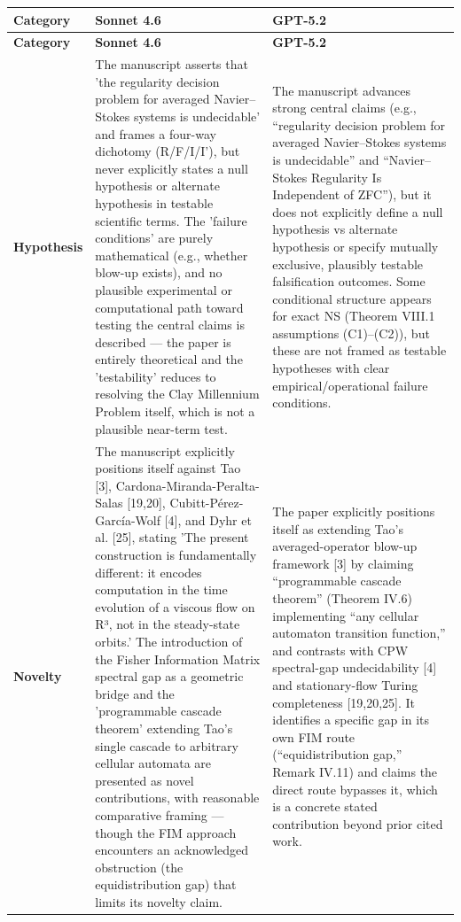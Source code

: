 \documentclass[11pt]{article}
\begin{document}
\begin{longtable}{@{} p{2.2cm} p{6.3cm} p{6.3cm} @{}}
\toprule
\textbf{Category} & \textbf{Sonnet 4.6} & \textbf{GPT-5.2} \\
\midrule
\endfirsthead
\toprule
\textbf{Category} & \textbf{Sonnet 4.6} & \textbf{GPT-5.2} \\
\midrule
\endhead
\bottomrule
\endlastfoot

\rowcolor{rowgray}
\textbf{Hypothesis} &
The manuscript asserts that 'the regularity decision problem for averaged Navier–Stokes systems is undecidable' and frames a four-way dichotomy (R/F/I/I'), but never explicitly states a null hypothesis or alternate hypothesis in testable scientific terms. The 'failure conditions' are purely mathematical (e.g., whether blow-up exists), and no plausible experimental or computational path toward testing the central claims is described — the paper is entirely theoretical and the 'testability' reduces to resolving the Clay Millennium Problem itself, which is not a plausible near-term test. &
The manuscript advances strong central claims (e.g., “regularity decision problem for averaged Navier–Stokes systems is undecidable” and “Navier–Stokes Regularity Is Independent of ZFC”), but it does not explicitly define a null hypothesis vs alternate hypothesis or specify mutually exclusive, plausibly testable falsification outcomes. Some conditional structure appears for exact NS (Theorem VIII.1 assumptions (C1)–(C2)), but these are not framed as testable hypotheses with clear empirical/operational failure conditions. \\[6pt]

\textbf{Novelty} &
The manuscript explicitly positions itself against Tao [3], Cardona-Miranda-Peralta-Salas [19,20], Cubitt-Pérez-García-Wolf [4], and Dyhr et al. [25], stating 'The present construction is fundamentally different: it encodes computation in the time evolution of a viscous flow on R³, not in the steady-state orbits.' The introduction of the Fisher Information Matrix spectral gap as a geometric bridge and the 'programmable cascade theorem' extending Tao's single cascade to arbitrary cellular automata are presented as novel contributions, with reasonable comparative framing — though the FIM approach encounters an acknowledged obstruction (the equidistribution gap) that limits its novelty claim. &
The paper explicitly positions itself as extending Tao’s averaged-operator blow-up framework [3] by claiming “programmable cascade theorem” (Theorem IV.6) implementing “any cellular automaton transition function,” and contrasts with CPW spectral-gap undecidability [4] and stationary-flow Turing completeness [19,20,25]. It identifies a specific gap in its own FIM route (“equidistribution gap,” Remark IV.11) and claims the direct route bypasses it, which is a concrete stated contribution beyond prior cited work. \\[6pt]


\end{longtable}
\end{document}

